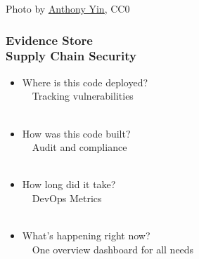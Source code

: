 \documentclass[aspectratio=169,11pt,hyperref={colorlinks=true}]{beamer}
\begin{document}
\begin{textondarkpic}{%
  Photo by \href{https://unsplash.com/@anthonyin}{\underline{Anthony Yin}}, CC0
  }%
  \frametitle{Evidence Store\\Supply Chain Security}
  \begin{itemize}
    \item Where is this code deployed?\\
          ~~Tracking vulnerabilities\\~
    \item How was this code built?\\
          ~~Audit and compliance\\~
    \item How long did it take?\\
          ~~DevOps Metrics\\~
    \item What's happening right now?\\
          ~~One overview dashboard for all needs
  \end{itemize}
\end{textondarkpic}
\end{document}
